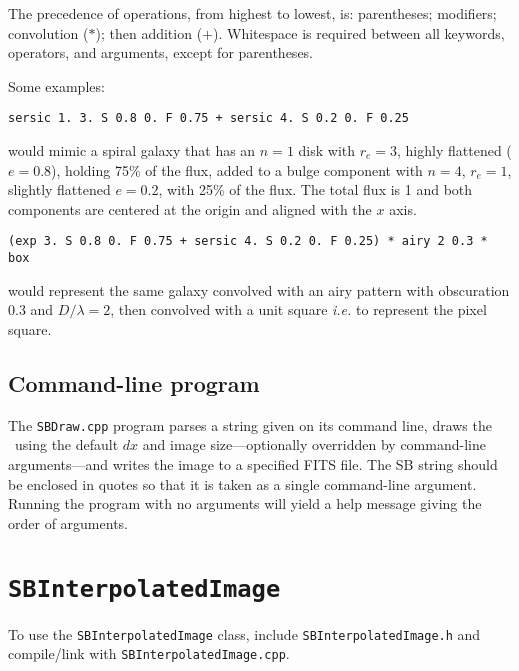 \documentclass[11pt,preprint,flushrt]{aastex}
\begin{document}
The precedence of operations, from highest to lowest, is: parentheses; modifiers; convolution ($*$); then addition ($+$).  Whitespace is required between all keywords, operators, and arguments, except for parentheses.

Some examples:
\begin{verbatim}
sersic 1. 3. S 0.8 0. F 0.75 + sersic 4. S 0.2 0. F 0.25
\end{verbatim}
would mimic a spiral galaxy that has an $n=1$ disk with $r_e=3$, highly flattened ($e=0.8$), holding 75\% of the flux, added to a bulge component with $n=4$, $r_e=1$, slightly flattened $e=0.2$, with 25\% of the flux.  The total flux is 1 and both components are centered at the origin and aligned with the $x$ axis.
\begin{verbatim}
(exp 3. S 0.8 0. F 0.75 + sersic 4. S 0.2 0. F 0.25) * airy 2 0.3 * box
\end{verbatim}
would represent the same galaxy convolved with an airy pattern with obscuration 0.3 and $D/\lambda=2$, then convolved with a unit square {\it i.e.} to represent the pixel square.

\subsection{Command-line program}
The {\tt SBDraw.cpp} program parses a string given on its command line, draws the \sbp\ using the default $dx$ and image size---optionally overridden by command-line arguments---and writes the image to a specified FITS file.   The SB string should be enclosed in quotes so that it is taken as a single command-line argument.  Running the program with no arguments will yield a help message giving the order of arguments.

\section{{\tt SBInterpolatedImage}}
\label{sbpixel}
To use the {\tt SBInterpolatedImage} class, include {\tt SBInterpolatedImage.h} and compile/link with {\tt SBInterpolatedImage.cpp}.
\end{document}
